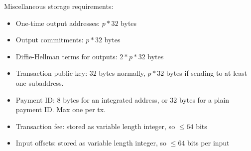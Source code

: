 Miscellaneous storage requirements:
\begin{itemize}
    \setlength\itemsep{\listspace}
    \item One-time output addresses: $p*32$ bytes
    \item Output commitments: $p*32$ bytes
    \item Diffie-Hellman terms for outputs: $2*p*32$ bytes
    \item Transaction public key: 32 bytes normally, $p*32$ bytes if sending to at least one subaddress.
    \item Payment ID: 8 bytes for an integrated address, or 32 bytes for a plain payment ID. Max one per tx.
    \item Transaction fee: stored as variable length integer, so $\leq 64$ bits
    \item Input offsets: stored as variable length integer, so $\leq 64$ bits per input
\end{itemize}